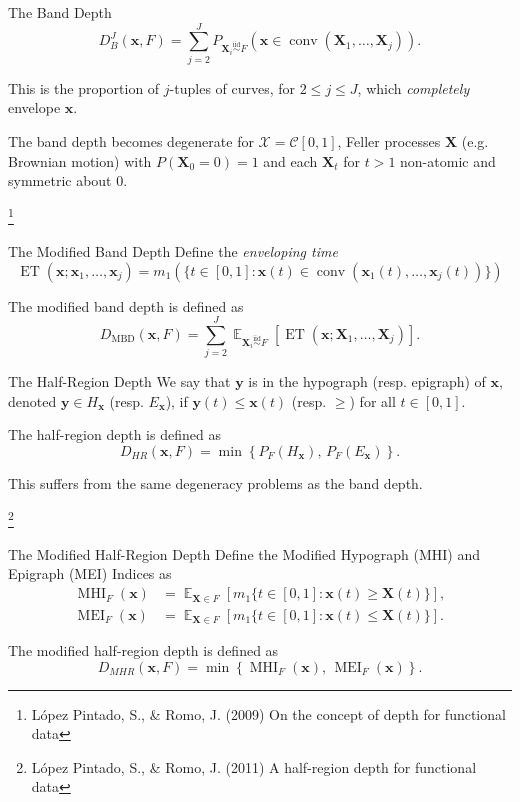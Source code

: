 \documentclass[handout, notes]{beamer}
\newcommand{\vx}{\bm{x}}
\newcommand{\vy}{\bm{y}}
\newcommand{\vX}{\bm{X}}
\newcommand{\iid}{\overset{\text{iid}}{\sim}}
\DeclareMathOperator{\E}{\mathbb{E}}
\DeclareMathOperator{\conv}{conv}
\DeclareMathOperator{\ET}{ET}
\DeclareMathOperator{\MHI}{MHI}
\DeclareMathOperator{\MEI}{MEI}
\DeclareMathOperator{\MBD}{MBD}
\newcommand\blfootnote[1]{%
  \begingroup
  \renewcommand\thefootnote{}\footnote{#1}%
  \addtocounter{footnote}{-1}%
  \endgroup
}
\begin{document}
    \begin{frame}{The Band Depth}
        \[
            D_B^J(\vx, F) = \sum_{j = 2}^J P_{\vX_i \iid F}(\vx \in \conv(\vX_1, \dots, \vX_j)).
        \]

        This is the proportion of $j$-tuples of curves, for $2 \leq j \leq J$,
        which \emph{completely} envelope $\vx$.

        The band depth becomes degenerate for $\mathscr{X} = \mathcal{C}[0,
        1]$, Feller processes $\vX$ (e.g. Brownian motion) with $P(\vX_0 = 0)
        = 1$ and each $\vX_t$ for $t > 1$ non-atomic and symmetric about $0$.

        \blfootnote{
            L\'opez Pintado, S., \& Romo, J. (2009) On the concept of depth
            for functional data
        }
    \end{frame}

    \begin{frame}{The Modified Band Depth}
        Define the \emph{enveloping time} \[
            \ET(\vx; \vx_1, \dots, \vx_j) = m_1(\{t \in [0, 1]\colon \vx(t) \in \conv(\vx_1(t), \dots, \vx_j(t))\})
        \]

        The modified band depth is defined as \[
            D_{\MBD}(\vx, F) = \sum_{j = 2}^J \E_{\vX_i \iid F}\left[\ET(\vx; \vX_1, \dots, \vX_j)\right].
        \]
    \end{frame}

    \begin{frame}{The Half-Region Depth}
        We say that $\vy$ is in the hypograph (resp. epigraph) of $\vx$,
        denoted $\vy \in H_{\vx}$ (resp. $E_{\vx}$), if $\vy(t) \leq \vx(t)$
        (resp. $\geq$) for all $t \in [0, 1]$.

        The half-region depth is defined as \[
            D_{HR}(\vx, F) = \min\left\{P_F(H_{\vx}),\, P_F(E_{\vx})\right\}.
        \]

        This suffers from the same degeneracy problems as the band depth.

        \blfootnote{
            L\'opez Pintado, S., \& Romo, J. (2011) A half-region depth for
            functional data
        }
    \end{frame}

    \begin{frame}{The Modified Half-Region Depth}
        Define the Modified Hypograph (MHI) and Epigraph (MEI) Indices as
        \begin{align*}
            \MHI_F(\vx) &= \E_{\vX \in F}[m_1\{t \in [0, 1]\colon \vx(t) \geq \vX(t)\}], \\
            \MEI_F(\vx) &= \E_{\vX \in F}[m_1\{t \in [0, 1]\colon \vx(t) \leq \vX(t)\}].
        \end{align*}

        The modified half-region depth is defined as \[
            D_{MHR}(\vx, F) = \min\left\{\MHI_F({\vx}),\, \MEI_F({\vx})\right\}.
        \]
    \end{frame}
\end{document}
